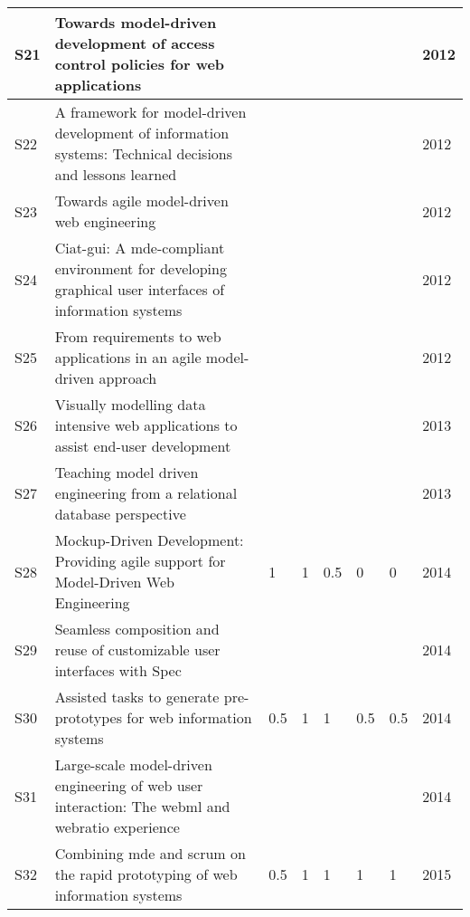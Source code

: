 \begin{table*}[ht!]
\begin{tabular}{ | p{0.3cm} | p{10.0cm} | p{0.7cm} |  p{0.7cm} | p{0.7cm} | p{0.7cm} | p{0.7cm}| p{0.7cm}|}
S21 &  Towards model-driven development of access control policies for web applications~\cite{Busch12}   &  & & & &  & 2012 \\ \hline

S22 &  A framework for model-driven development of information systems: Technical decisions and lessons learned~\cite{Vara12}  &  & & & &  & 2012 \\ \hline

S23 &  Towards agile model-driven  web  engineering~\cite{Rivero12}  &  & & & & & 2012 \\ \hline

S24 & Ciat-gui:  A  mde-compliant  environment  for  developing  graphical  user interfaces of information systems~\cite{Molina12}  &  & & & &  & 2012 \\ \hline

S25 &  From requirements to web applications in an agile model-driven approach~\cite{Grigera12}  &  & & & &  & 2012 \\ \hline

S26 &  Visually modelling data intensive web applications to assist end-user development~\cite{Deufemia13}  &  & & & & & 2013 \\ \hline

S27 &  Teaching model driven engineering from a relational database perspective~\cite{Batory13MODELS}  &  & & & &  & 2013 \\ \hline

S28 &  Mockup-Driven Development: Providing agile support for Model-Driven Web Engineering~\cite{Rivero2014}  & 1 & 1 & 0.5 & 0 & 0 & 2014\\ \hline


S29 &  Seamless composition and reuse of customizable user interfaces with Spec~\cite{VANRYSEGHEM201434}	 &  & & & &  & 2014 \\ \hline

S30 &  Assisted tasks to generate pre-prototypes for web information systems~\cite{Basso14ICEISb}  & 0.5 & 1 & 1 & 0.5 & 0.5 & 2014 \\ \hline

S31 &  Large-scale model-driven engineering of web user interaction: The webml and webratio experience~\cite{Brambilla14}  &  & & & & & 2014 \\ \hline

S32 &  Combining mde and scrum on the rapid prototyping of web information systems~\cite{Basso15IJWET}  & 0.5 & 1 & 1 & 1 & 1 & 2015  \\ \hline


\end{tabular}
\end{table*}
